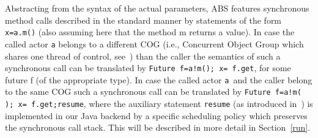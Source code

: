 Abstracting from the syntax of the actual parameters,
ABS features synchronous method calls described in the standard manner
by statements of the form \texttt{ x=a.m()} (also assuming here that the method m returns a value). In case the called actor \texttt{a} belongs to a different 
COG (i.e., Concurrent Object Group which shares one thread of control, see~\cite{abs})
than the caller the semantics of such a synchronous call can be translated
by \texttt{Future f=a!m(); x= f.get}, for some future f (of the appropriate type).
In case the called actor \texttt{a }and the caller belong to the same COG such a synchronous call can be translated by \texttt{Future f=a!m( ); x= f.get;resume},
where the auxiliary statement \texttt{resume} (as introduced in~\cite{resume})
is implemented in our Java backend by a specific scheduling policy which preserves the synchronous call stack.
This will be described in more detail in Section~\ref{run}.




